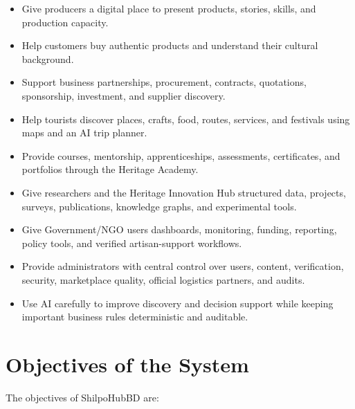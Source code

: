 \documentclass[12pt,a4paper]{report}
\begin{document}
\begin{itemize}
  \item Give producers a digital place to present products, stories, skills, and production capacity.
  \item Help customers buy authentic products and understand their cultural background.
  \item Support business partnerships, procurement, contracts, quotations, sponsorship, investment, and supplier discovery.
  \item Help tourists discover places, crafts, food, routes, services, and festivals using maps and an AI trip planner.
  \item Provide courses, mentorship, apprenticeships, assessments, certificates, and portfolios through the Heritage Academy.
  \item Give researchers and the Heritage Innovation Hub structured data, projects, surveys, publications, knowledge graphs, and experimental tools.
  \item Give Government/NGO users dashboards, monitoring, funding, reporting, policy tools, and verified artisan-support workflows.
  \item Provide administrators with central control over users, content, verification, security, marketplace quality, official logistics partners, and audits.
  \item Use AI carefully to improve discovery and decision support while keeping important business rules deterministic and auditable.
\end{itemize}

\chapter{Objectives of the System}

The objectives of ShilpoHubBD are:
\end{document}
